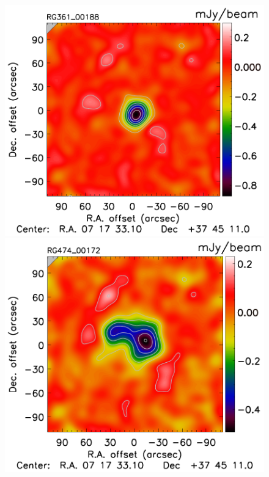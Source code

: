 \documentclass[twocolumn,traditabstract]{aa}
\begin{document}
\begin{figure}[h]
\includegraphics[trim=0cm 0.7cm 0cm 0cm, clip=true, totalheight=3.7cm]{Figure/DoG_RG361_00188_Ymap_zobs0p6_processed_15_15_45.pdf}
\includegraphics[trim=0cm 0.7cm 0cm 0cm, clip=true, totalheight=3.7cm]{Figure/DoG_RG474_00172_Ymap_zobs0p9_processed_15_15_45.pdf}

\end{figure}
\end{document}
